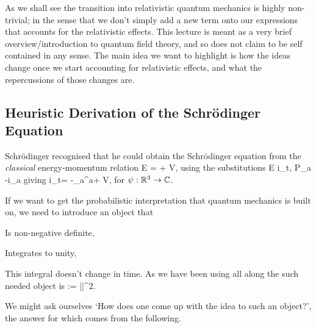 As we shall see the transition into relativistic quantum mechanics is highly non-trivial; in the sense that we don't simply add a new term onto our expressions that accounts for the relativistic effects. This lecture is meant as a very brief overview/introduction to quantum field theory, and so does not claim to be self contained in any sense. The main idea we want to highlight is how the ideas change once we start accounting for relativistic effects, and what the repercussions of those changes are. 

\subsection{Heuristic Derivation of the Schr\"{o}dinger Equation}

Schr\"{o}dinger recognised that he could obtain the Schr\"{o}dinger equation from the \emph{classical} energy-momentum relation
\bse 
E =  + V,
\ese 
using the substitutions 
\bse 
E \squiggle i\hbar\partial_t, \qquad \qquad P_a \squiggle -i\hbar\partial_a
\ese 
giving 
\bse 
i\hbar\partial_t\psi = -\partial_a\partial^a\psi + V\psi,
\ese 
for $\psi:\mathbb{R}^3\to\mathbb{C}$. 

If we want to get the probabilistic interpretation that quantum mechanics is built on, we need to introduce an object that
\ben[label=(\roman*)]
\item Is non-negative definite, 
\item Integrates to unity,
\item This integral doesn't change in time. 
\een 
As we have been using all along the such needed object is 
\bse 
\rho := |\psi|^2.
\ese 

We might ask ourselves `How does one come up with the idea to such an object?', the answer for which comes from the following. 

